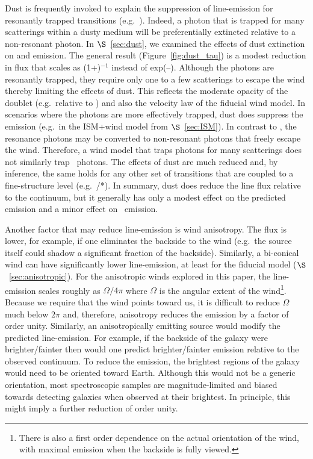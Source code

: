 \documentclass[12pt,preprint]{aastex}
\begin{document}
Dust is frequently invoked to explain the suppression of line-emission
for resonantly trapped transitions (e.g.\ \lya).  Indeed, a photon
that is trapped for many scatterings within a dusty medium will 
be preferentially extincted relative to a non-resonant photon.  In
$\S$~\ref{sec:dust}, we examined the effects of dust extinction on 
 and  emission.  The general result
(Figure~\ref{fig:dust_tau}) is a modest
reduction in flux that scales as (1+\taud)$^{-1}$ instead of
exp(--\taud). Although the  photons are resonantly
trapped, they require only one to a few scatterings
to escape the wind thereby limiting the effects of
dust.  This reflects the moderate opacity of the 
doublet (e.g.\ relative to \lya) and also the velocity law of the
fiducial wind model.
In scenarios where the  photons are
more effectively trapped, dust does suppress
the emission (e.g.\ in the ISM+wind model from $\S$~\ref{sec:ISM}).
In contrast to , 
the  resonance photons may be
converted to non-resonant photons that freely escape the wind.
Therefore, a wind model that traps 
photons for many scatterings does not similarly trap 
\feiid\ photons.  The effects of dust are much 
reduced and, by inference, the same holds for any other set of
transitions that are coupled to a fine-structure level (e.g.\
/*).  In summary,
dust does reduce the line flux relative to the continuum, but 
it generally has only a modest effect on the predicted 
emission and a minor effect on \feiis\ emission.

Another factor that may reduce line-emission is %
wind %
anisotropy. The flux is lower, for example, if one
eliminates the backside to the wind (e.g.\ the source itself could
shadow a significant fraction of the backside).  
Similarly, a bi-conical
wind can have significantly lower line-emission, at 
least for the fiducial model ($\S$~\ref{sec:anisotropic}). 
For the anisotropic winds explored in this paper,
the line-emission scales 
roughly as $\Omega/4\pi$ where $\Omega$ is the angular extent of the
wind\footnote{There is also a first order dependence on the actual
  orientation of the wind, with maximal emission when the backside is
  fully viewed.}.  Because we require that the wind 
points toward us, it is difficult to reduce $\Omega$ much
below $2 \pi$ and, therefore, anisotropy reduces the
emission by a factor of order unity.  
Similarly, an anisotropically emitting source would modify the predicted
line-emission.  For example, if the backside of the galaxy were
brighter/fainter then would one predict brighter/fainter emission
relative to the observed continuum.
To reduce the emission, the brightest regions
of the galaxy would need to be oriented toward Earth.  Although this
would not be a
generic orientation, most spectroscopic samples are magnitude-limited
and biased towards detecting galaxies when observed at their
brightest.  In principle, this might imply a further
reduction of order unity.
\end{document}
